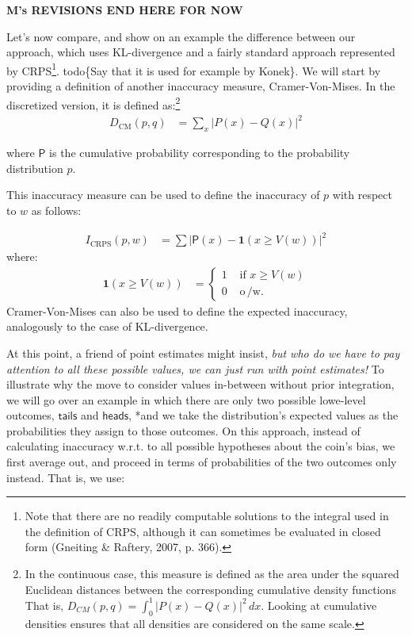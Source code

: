 \documentclass[
  letterpaper,
  DIV=11,
  numbers=noendperiod]{scrartcl}
\begin{document}
\textbf{M's REVISIONS END HERE FOR NOW}

Let's now compare, and show on an example the difference between our
approach, which uses KL-divergence and a fairly standard approach
represented by CRPS\footnote{Note that there are no readily computable
  solutions to the integral used in the definition of CRPS, although it
  can sometimes be evaluated in closed form (Gneiting \& Raftery, 2007,
  p. 366).}. todo\{Say that it is used for example by Konek\}. We will
start by providing a definition of another inaccuracy measure,
Cramer-Von-Mises. In the discretized version, it is defined
as:\footnote{In the continuous case, this measure is defined as the area under the squared Euclidean distances between the corresponding cumulative density functions That is, $D_{CM}(p,q)  = \int_{0}^{1} \vert P(x) - Q(x)\vert^2 \, dx$. Looking at cumulative densities ensures that all densities are considered on the same scale.}
\begin{align*}
D_{\text{CM}}(p,q) & = \sum_{x} \vert P(x) - Q(x)\vert^2 
\end{align*}

\noindent where \(\mathsf{P}\) is the cumulative probability
corresponding to the probability distribution \(p\).

\noindent This inaccuracy measure can be used to define the inaccuracy
of \(p\) with respect to \(w\) as follows:

\begin{align*}
I_{\text{CRPS}}(p,w) &= \sum \vert \mathsf{P}(x) - \mathbf{ 1 }(x\geq V(w))\vert ^2 
\end{align*} \noindent where: \begin{align*}
\mathbf{ 1 }(x \geq V(w)) & = \begin{cases} 1 & \text{ if } x \geq V(w)\\
0 & \text{ o$\,$/w. }
\end{cases}
\end{align*} \noindent  Cramer-Von-Mises can also be used to define the
expected inaccuracy, analogously to the case of KL-divergence.

At this point, a friend of point estimates might insist,
\emph{but who do we have to pay attention to all these possible values, we can just run with point estimates!}
To illustrate why the move to consider values in-between without prior
integration, we will go over an example in which there are only two
possible lowe-level outcomes, \(\mathsf{tails}\) and \(\mathsf{heads}\),
*and we take the distribution's expected values as the probabilities
they assign to those outcomes. On this approach, instead of calculating
inaccuracy w.r.t. to all possible hypotheses about the coin's bias, we
first average out, and proceed in terms of probabilities of the two
outcomes only instead. That is, we use:
\end{document}

